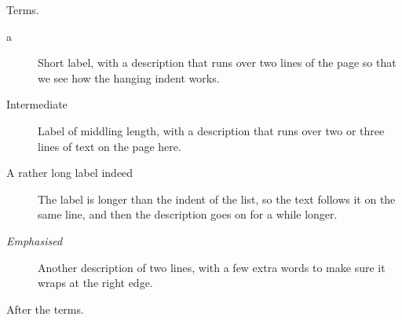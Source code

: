 \documentclass{article}
\begin{document}
Terms.
\begin{description}
\item[a] Short label, with a description that runs over two lines of the page so that we see how the hanging indent works.
\item[Intermediate] Label of middling length, with a description that runs over two or three lines of text on the page here.
\item[A rather long label indeed] The label is longer than the indent of the list, so the text follows it on the same line, and then the description goes on for a while longer.
\item[\emph{Emphasised}] Another description of two lines, with a few extra words to make sure it wraps at the right edge.
\end{description}
After the terms.
\end{document}
